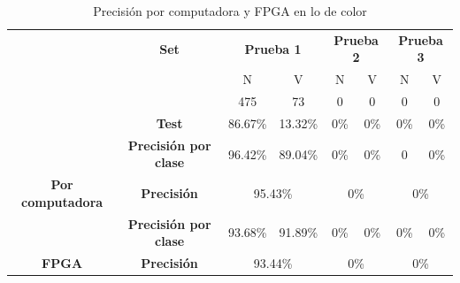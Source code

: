 \documentclass[twoside,spanish,ESP,MSc]{plantillaLabUPV}
\theoremstyle{definition}
\begin{document}
\begin{table}[h]
	\caption{Precisión por computadora y FPGA en lo de color}
	\label{imadatcol}
	\centering
\begin{tabular}{c|c|c|c|c|c|c|c|}
	\cline{2-8}
	& \textbf{Set}                    & \multicolumn{2}{c|}{\textbf{Prueba 1}}              & \multicolumn{2}{c|}{\textbf{Prueba 2}}              & \multicolumn{2}{c|}{\textbf{Prueba 3}}              \\ \cline{2-8} 
	&                                 & {\color[HTML]{F56B00} N} & {\color[HTML]{009901} V} & {\color[HTML]{F56B00} N} & {\color[HTML]{009901} V} & {\color[HTML]{F56B00} N} & {\color[HTML]{009901} V} \\ \cline{3-8} 
	&                                 & 475                      & 73                       & 0                        & 0                        & 0                        & 0                        \\ \cline{3-8} 
	& \multirow{-3}{*}{\textbf{Test}} & 86.67\%                  & 13.32\%                  & 0\%                      & 0\%                      & 0\%                      & 0\%                      \\ \hline
	\multicolumn{1}{|c|}{}                                           & \textbf{Precisión por clase}    & 96.42\%                  & 89.04\%                  & 0\%                      & 0\%                      & 0                        & 0\%                      \\ \cline{2-8} 
	\multicolumn{1}{|c|}{\multirow{-2}{*}{\textbf{Por computadora}}} & \textbf{Precisión}              & \multicolumn{2}{c|}{95.43\%}                        & \multicolumn{2}{c|}{0\%}                            & \multicolumn{2}{c|}{0\%}                            \\ \hline
	\multicolumn{1}{|c|}{}                                           & \textbf{Precisión por clase}    & 93.68\%                  & 91.89\%                  & 0\%                      & 0\%                      & 0\%                      & 0\%                      \\ \cline{2-8} 
	\multicolumn{1}{|c|}{\multirow{-2}{*}{\textbf{FPGA}}}            & \textbf{Precisión}              & \multicolumn{2}{c|}{93.44\%}                        & \multicolumn{2}{c|}{0\%}                            & \multicolumn{2}{c|}{0\%}                            \\ \hline
\end{tabular}
\end{table}
\end{document}
